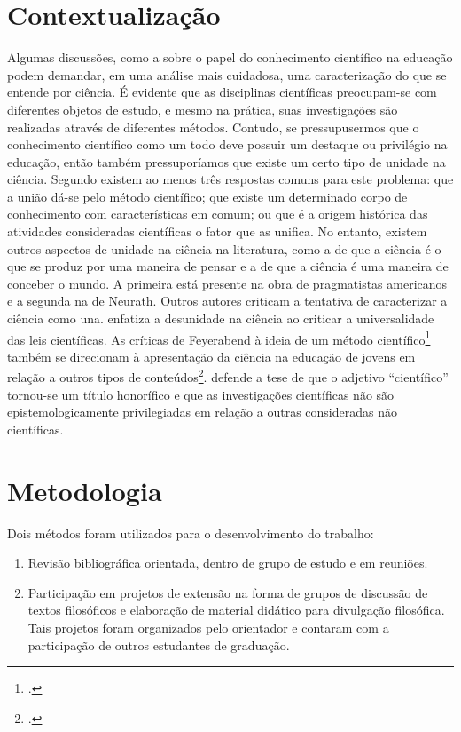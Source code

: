 \documentclass[12pt]{report}
\begin{document}
		\section*{Contextualização}		
		Algumas discussões, como a sobre o papel do conhecimento científico na educação podem demandar, em uma análise mais cuidadosa, uma caracterização do que se entende por ciência.
		É evidente que as disciplinas científicas preocupam-se com diferentes objetos de estudo, e mesmo na prática, suas investigações são realizadas através de diferentes métodos.
		Contudo, se pressupusermos que o conhecimento científico como um todo deve possuir um destaque ou privilégio na educação, então também pressuporíamos que existe um certo tipo de unidade na ciência.
		Segundo \textcite{cunha-unidade} existem ao menos três respostas comuns para este problema: que a união dá-se pelo método científico; que existe um determinado corpo de conhecimento com características em comum; ou que é a origem histórica das atividades consideradas científicas o fator que as unifica.
		No entanto, existem outros aspectos de unidade na ciência na literatura, como a de que a ciência é o que se produz por uma maneira de pensar e a de que a ciência é uma maneira de conceber o mundo. A primeira está presente na obra de pragmatistas americanos e a segunda na de Neurath.
		Outros autores criticam a tentativa de caracterizar a ciência como una.
		\textcite{cartwright-dappled-world} enfatiza a desunidade na ciência ao criticar a universalidade das leis científicas.
		As críticas de Feyerabend à ideia de um método científico\footcite{feyerabend-against-method} também se direcionam à apresentação da ciência na educação de jovens em relação a outros tipos de conteúdos\footcite{feyerabend-science-free-society}.
		\textcite{haack-defending-science} defende a tese de que o adjetivo “científico” tornou-se um título honorífico e que as investigações científicas não são epistemologicamente privilegiadas em relação a outras consideradas não científicas. 
	
		\section*{Metodologia}
		
		Dois métodos foram utilizados para o desenvolvimento do trabalho:
		
		\begin{enumerate}
			\item Revisão bibliográfica orientada, dentro de grupo de estudo e em reuniões.
			\item Participação em projetos de extensão na forma de grupos de discussão de textos filosóficos e elaboração de material didático para divulgação filosófica. Tais projetos foram organizados pelo orientador e contaram com a participação de outros
			estudantes de graduação. 
		\end{enumerate}
\end{document}
